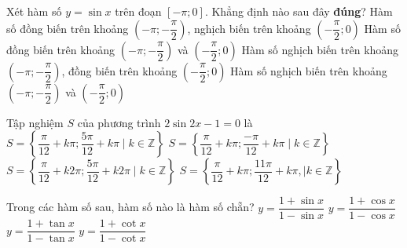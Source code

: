 \begin{ex}%
	Xét hàm số $  y=\sin x $ trên đoạn $ [-\pi;0] $. Khẳng định nào sau đây \textbf{đúng}?
	 \choice
		{Hàm số đồng biến trên khoảng $ \left(-\pi;-\dfrac{\pi}{2}\right) $, nghịch biến trên khoảng $ \left(-\dfrac{\pi}{2};0\right)$} 
		{Hàm số đồng biến trên khoảng $  \left(-\pi;-\dfrac{\pi}{2}\right) $ và $ \left(-\dfrac{\pi}{2};0\right)$}
		{\True Hàm số nghịch biến trên khoảng $ \left(-\pi;-\dfrac{\pi}{2}\right) $, đồng  biến trên khoảng $ \left(-\dfrac{\pi}{2};0\right)$}
		{Hàm số nghịch biến trên khoảng $ \left(-\pi;-\dfrac{\pi}{2}\right) $  và $ \left(-\dfrac{\pi}{2};0\right)$}
\end{ex}

\begin{ex}%
	Tập nghiệm $S$ của  phương trình $2\sin 2x-1=0$ là
	 \choice
		 {\True $S=\left\{\dfrac{\pi}{12}+k\pi; \dfrac{5\pi}{12}+k\pi\mid k\in \mathbb{Z}\right\}$}
		{$S=\left\{\dfrac{\pi}{12}+k\pi; \dfrac{-\pi}{12}+k\pi\mid k\in \mathbb{Z}\right\} $} 
		{$S=\left\{\dfrac{\pi}{12}+k2\pi; \dfrac{5\pi}{12}+k2\pi  \mid k \in \mathbb{Z}\right\} $}
		{$S=\left\{\dfrac{\pi}{12}+k\pi; \dfrac{11\pi}{12}+k\pi,  \mid k\in \mathbb{Z}\right\}$}
\end{ex}

\begin{ex}%
	Trong các hàm số  sau, hàm số nào là hàm số chẵn?
	 \choice
		{$y=\dfrac{1+\sin  x}{1-\sin x}$}
		{\True $y=\dfrac{1+\cos  x}{1-\cos x}$}
		 {$y=\dfrac{1+\tan x}{1-\tan x}$}
		{$y=\dfrac{1+\cot  x}{1-\cot x}$}
\end{ex}

